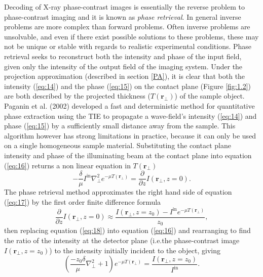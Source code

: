\documentclass[10pt, a4paper, singlespacing]{report}
\begin{document}
Decoding of X-ray phase-contrast images is essentially the reverse problem to phase-contrast imaging and it is known as \textit{phase retrieval}. 
In general inverse problems are more complex than forward problems. Often inverse problems are unsolvable, and even if there exist possible solutions to these problems, these may not be unique or stable with regards to realistic experimental conditions. 
Phase retrieval seeks to reconstruct both the intensity and phase of the input field, given only the intensity of the output field of the imaging system\cite{PagsTutes}\cite{Pags2002}. Under the projection approximation (described in section \ref{PA}), it is clear that both the intensity (\ref{eq:14}) and the phase (\ref{eq:15}) on the contact plane (Figure \ref{fig:1.2}) are both described by the projected thickness ($T(\mathbf{r}_{\perp})$) of the sample object. Paganin et al. (2002) developed a fast and deterministic method for quantitative phase extraction\cite{Pags2002} using the TIE to propagate a wave-field's intensity (\ref{eq:14}) and phase (\ref{eq:15}) by a sufficiently small distance away from the sample. This algorithm however has strong limitations in practice, because it can only be used on a single homogeneous sample material.
Substituting the contact plane intensity and phase of the illuminating beam at the contact plane into equation (\ref{eq:16}) returns a non linear equation in $T(\mathbf{r}_{\perp})$
\begin{equation}\label{eq:17}
- \frac{\delta}{\mu} I^{\mathrm{in}} \nabla^{2}_{\perp} e^{-\mu T(\mathbf{r}_{\perp})} = \frac{\partial}{\partial z}I(\mathbf{r}_{\perp}, z=0).
\end{equation}
The phase retrieval method\cite{Pags2002} approximates the right hand side of equation (\ref{eq:17}) by the first order finite difference formula
\begin{equation}\label{eq:18}
\frac{\partial}{\partial z}I(\mathbf{r}_{\perp}, z=0) \approx \frac{I(\mathbf{r}_{\perp}, z=z_0) - I^{\mathrm{in}} e^{-\mu T(\mathbf{r}_{\perp})}}{z_0},
\end{equation}
then replacing equation (\ref{eq:18}) into equation (\ref{eq:16}) and rearranging to find the ratio of the intensity at the detector plane (i.e.the phase-contrast image $I(\mathbf{r}_{\perp}, z = z_0)$) to the intensity initially incident to the object, giving
 \begin{equation}\label{eq:19}
\left (\frac{- z_0 \delta}{\mu}\nabla^{2}_{\perp} + 1 \right )e^{-\mu T(\mathbf{r}_{\perp})} = \frac{I(\mathbf{r}_{\perp}, z=z_0)}{I^{\mathrm{in}}}.
\end{equation}
\end{document}
